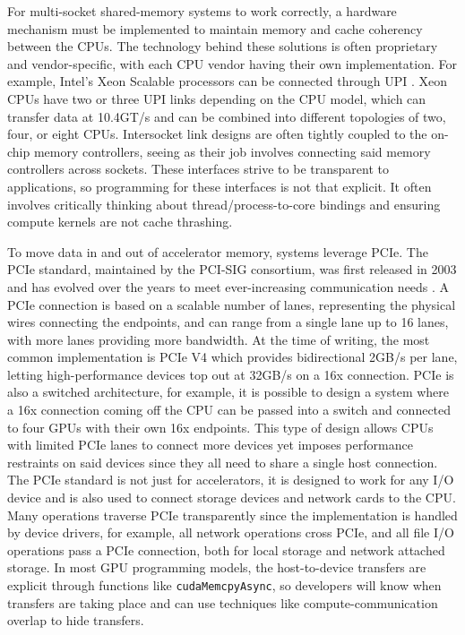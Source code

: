 For multi-socket shared-memory systems to work correctly, a hardware mechanism must be implemented to maintain memory and cache coherency between the \gls{CPU}s.  
The technology behind these solutions is often proprietary and vendor-specific, with each \gls{CPU} vendor having their own implementation.
For example, Intel's Xeon Scalable processors can be connected through \gls{UPI} \cite{XeonTechOverview}.
Xeon \gls{CPU}s have two or three \gls{UPI} links depending on the \gls{CPU} model, which can transfer data at 10.4GT/s and can be combined into different topologies of two, four, or eight \gls{CPU}s.
Intersocket link designs are often tightly coupled to the on-chip memory controllers, seeing as their job involves connecting said memory controllers across sockets.
These interfaces strive to be transparent to applications, so programming for these interfaces is not that explicit. 
It often involves critically thinking about thread/process-to-core bindings and ensuring compute kernels are not cache thrashing.

To move data in and out of accelerator memory, systems leverage \gls{PCIe}.
The \gls{PCIe} standard, maintained by the PCI-SIG consortium, was first released in 2003 and has evolved over the years to meet ever-increasing communication needs \cite{PCIeIntroPaper, PCIeV5Spec}.
A \gls{PCIe} connection is based on a scalable number of lanes, representing the physical wires connecting the endpoints, and can range from a single lane up to 16 lanes, with more lanes providing more bandwidth.
At the time of writing, the most common implementation is \gls{PCIe} V4 which provides bidirectional 2GB/s per lane, letting high-performance devices top out at 32GB/s on a 16x connection. 
\gls{PCIe} is also a switched architecture, for example, it is possible to design a system where a 16x connection coming off the \gls{CPU} can be passed into a switch and connected to four \gls{GPU}s with their own 16x endpoints.
This type of design allows \gls{CPU}s with limited \gls{PCIe} lanes to connect more devices yet imposes performance restraints on said devices since they all need to share a single host connection.
The \gls{PCIe} standard is not just for accelerators, it is designed to work for any I/O device and is also used to connect storage devices and network cards to the \gls{CPU}.
Many operations traverse \gls{PCIe} transparently since the implementation is handled by device drivers, for example, all network operations cross \gls{PCIe}, and all file I/O operations pass a \gls{PCIe} connection, both for local storage and network attached storage.
In most \gls{GPU} programming models, the host-to-device transfers are explicit through functions like \texttt{cudaMemcpyAsync}, so developers will know when transfers are taking place and can use techniques like compute-communication overlap to hide transfers.

